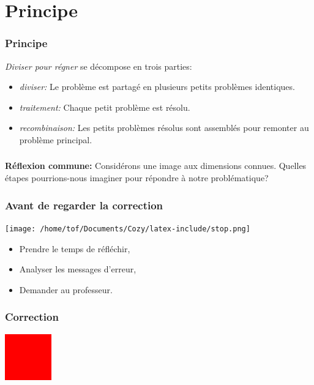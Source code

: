 \documentclass[svgnames,11pt]{beamer}
\begin{document}
\section{Principe}
\begin{frame}
    \frametitle{Principe}

    \emph{Diviser pour régner} se décompose en trois parties:
    \begin{itemize}
        \item \emph{diviser:} Le problème est partagé en plusieurs petits problèmes identiques.
        \item \emph{traitement:} Chaque petit problème est résolu.
        \item \emph{recombinaison:} Les petits problèmes résolus sont assemblés pour remonter au problème principal.
    \end{itemize}

\end{frame}
\begin{frame}
    \frametitle{}

    \begin{activite}
        \textbf{Réflexion commune:} Considérons une image aux dimensions connues. Quelles étapes pourrions-nous imaginer pour répondre à notre problématique?
    \end{activite}

\end{frame}
\begin{frame}
    \frametitle{Avant de regarder la correction}
    \begin{center}
        \centering
        \texttt{[image: /home/tof/Documents/Cozy/latex-include/stop.png]}
    \end{center}
    {\Large
    \begin{itemize}
        \item Prendre le temps de réfléchir,
        \item Analyser les messages d'erreur,
        \item Demander au professeur.
    \end{itemize}
    }
\end{frame}
\begin{frame}
    \frametitle{Correction}

    \begin{center}
        \centering
        \includegraphics[width=2cm]{ressources/carre0.png}
        \label{IMG}
    \end{center}

\end{frame}
\end{document}
